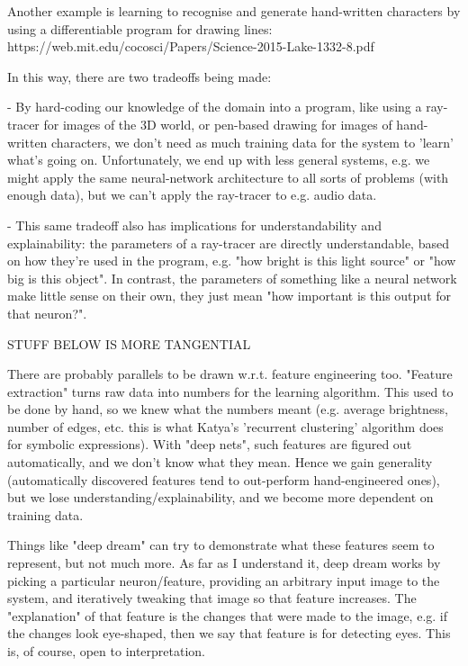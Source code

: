 Another example is learning to recognise and generate hand-written
characters by using a differentiable program for drawing lines:
https://web.mit.edu/cocosci/Papers/Science-2015-Lake-1332-8.pdf‎

In this way, there are two tradeoffs being made:

 - By hard-coding our knowledge of the domain into a program, like using
   a ray-tracer for images of the 3D world, or pen-based drawing for
   images of hand-written characters, we don't need as much training
   data for the system to 'learn' what's going on. Unfortunately, we end
   up with less general systems, e.g. we might apply the same
   neural-network architecture to all sorts of problems (with enough
   data), but we can't apply the ray-tracer to e.g. audio data.

 - This same tradeoff also has implications for understandability and
   explainability: the parameters of a ray-tracer are directly
   understandable, based on how they're used in the program, e.g. "how
   bright is this light source" or "how big is this object". In
   contrast, the parameters of something like a neural network make
   little sense on their own, they just mean "how important is this
   output for that neuron?".

STUFF BELOW IS MORE TANGENTIAL

There are probably parallels to be drawn w.r.t. feature engineering
too. "Feature extraction" turns raw data into numbers for the learning
algorithm. This used to be done by hand, so we knew what the numbers
meant (e.g. average brightness, number of edges, etc. this is what
Katya's 'recurrent clustering' algorithm does for symbolic expressions).
With "deep nets", such features are figured out automatically, and we
don't know what they mean. Hence we gain generality (automatically
discovered features tend to out-perform hand-engineered ones), but we
lose understanding/explainability, and we become more dependent on
training data.

Things like "deep dream" can try to demonstrate what these features
seem to represent, but not much more. As far as I understand it, deep
dream works by picking a particular neuron/feature, providing an
arbitrary input image to the system, and iteratively tweaking that image
so that feature increases. The "explanation" of that feature is the
changes that were made to the image, e.g. if the changes look
eye-shaped, then we say that feature is for detecting eyes. This is, of
course, open to interpretation.

